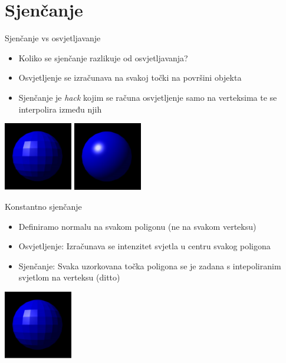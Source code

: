 \documentclass[9pt]{beamer}
\begin{document}
\section{Sjenčanje}
\begin{frame}{Sjenčanje vs osvjetljavanje}
	\begin{itemize}%
		\item Koliko se sjenčanje razlikuje od osvjetljavanja?
		\item Osvjetljenje se izračunava na svakoj točki na površini objekta
		\item Sjenčanje je \textsl{hack} kojim se računa osvjetljenje samo na verteksima te se interpolira između njih
	\end{itemize}
	\begin{center}
		\includegraphics[width=3cm]{slike/shade_vs_light_01.png}
		\includegraphics[width=3cm]{slike/shade_vs_light_02.png}
	\end{center}
\end{frame}

\begin{frame}{Konstantno sjenčanje}
	\begin{itemize}%
		\item Definiramo normalu na svakom poligonu (ne na svakom verteksu)
		\item Osvjetljenje: Izračunava se intenzitet svjetla u centru svakog poligona
		\item Sjenčanje: Svaka uzorkovana točka poligona se je zadana s intepoliranim svjetlom na verteksu (ditto)
	\end{itemize}
	\begin{center}
		\includegraphics[width=3cm]{slike/shade_vs_light_01.png}
	\end{center}
\end{frame}
\end{document}

